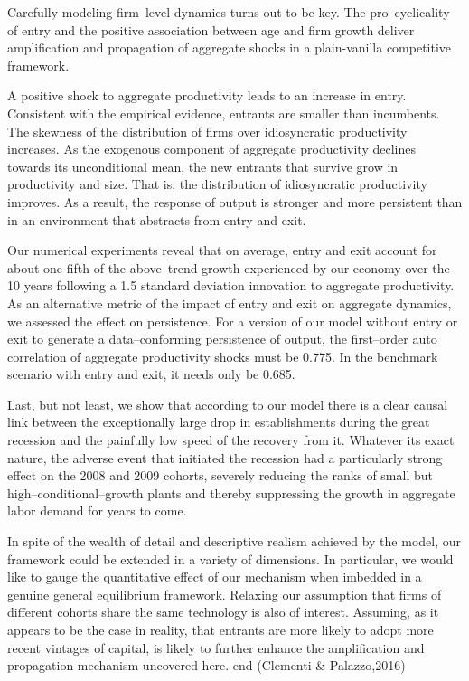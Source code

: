\documentclass[
  12pt,
  oneside]{book}
\begin{document}
Carefully modeling firm--level dynamics turns out to be key. The pro--cyclicality of entry and the positive association between age and firm growth deliver amplification and propagation of aggregate shocks in a plain-vanilla competitive framework.

A positive shock to aggregate productivity leads to an increase in entry. Consistent with the empirical evidence, entrants are smaller than incumbents. The skewness of the distribution of firms over idiosyncratic productivity increases. As the exogenous component of aggregate productivity declines towards its unconditional mean, the new entrants that survive grow in productivity and size. That is, the distribution of idiosyncratic productivity improves. As a result, the response of output is stronger and more persistent than in an environment that abstracts from entry and exit.

Our numerical experiments reveal that on average, entry and exit account for about one fifth of the above--trend growth experienced by our economy over the 10 years following a 1.5 standard deviation innovation to aggregate productivity. As an alternative metric of the impact of entry and exit on aggregate dynamics, we assessed the effect on persistence. For a version of our model without entry or exit to generate a data--conforming persistence of output, the first--order auto correlation of aggregate productivity shocks must be 0.775. In the benchmark scenario with entry and exit, it needs only be 0.685.

Last, but not least, we show that according to our model there is a clear causal link between the exceptionally large drop in establishments during the great recession and the painfully low speed of the recovery from it. Whatever its exact nature, the adverse event that initiated the recession had a particularly strong effect on the 2008 and 2009 cohorts, severely reducing the ranks of small but high--conditional--growth plants and thereby suppressing the growth in aggregate labor demand for years to come.

In spite of the wealth of detail and descriptive realism achieved by the model, our framework could be extended in a variety of dimensions. In particular, we would like to gauge the quantitative effect of our mechanism when imbedded in a genuine general equilibrium framework. Relaxing our assumption that firms of different cohorts share the same technology is also of interest. Assuming, as it appears to be the case in reality, that entrants are more likely to adopt more recent vintages of capital, is likely to further enhance the amplification and propagation mechanism uncovered here.
end (Clementi \& Palazzo,2016)
\end{document}
